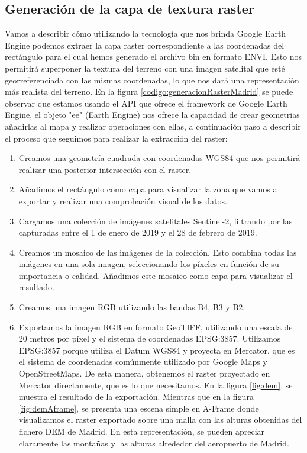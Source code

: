 \documentclass[a4paper, 11pt]{book}
\begin{document}
\subsection{Generación de la capa de textura raster}
\label{sec:raster}
Vamos a describir cómo utilizando la tecnología que nos brinda Google Earth Engine podemos extraer la capa raster correspondiente a las coordenadas del rectángulo para el cual hemos generado el archivo bin en formato ENVI. Esto nos permitirá superponer la textura del terreno con una imagen satelital que esté georreferenciada con las mismas coordenadas, lo que nos dará una representación más realista del terreno.
En la figura \ref{codigo:generacionRasterMadrid} se puede observar que estamos usando el API que ofrece el framework de Google Earth Engine, el objeto "ee" (Earth Engine) nos ofrece la capacidad de crear geometrias añadirlas al mapa y realizar operaciones con ellas, a continuación paso a describir el proceso que seguimos para realizar la extracción del raster:
\begin{enumerate}
    \item Creamos una geometría cuadrada con coordenadas WGS84 que nos permitirá realizar una posterior intersección con el raster.
    \item Añadimos el rectángulo como capa para visualizar la zona que vamos a exportar y realizar una comprobación visual de los datos.
    \item Cargamos una colección de imágenes satelitales Sentinel-2, filtrando por las capturadas entre el 1 de enero de 2019 y el 28 de febrero de 2019.
    \item Creamos un mosaico de las imágenes de la colección. Esto combina todas las imágenes en una sola imagen, seleccionando los píxeles en función de su importancia o calidad. Añadimos este mosaico como capa para visualizar el resultado.
    \item Creamos una imagen RGB utilizando las bandas B4, B3 y B2.
    \item Exportamos la imagen RGB en formato GeoTIFF, utilizando una escala de 20 metros por píxel y el sistema de coordenadas EPSG:3857. Utilizamos EPSG:3857 porque utiliza el Datum WGS84 y proyecta en Mercator, que es el sistema de coordenadas comúnmente utilizado por Google Maps y OpenStreetMaps. De esta manera, obtenemos el raster proyectado en Mercator directamente, que es lo que necesitamos.
    En la figura \ref{fig:dem}, se muestra el resultado de la exportación. Mientras que en la figura \ref{fig:demAframe}, se presenta una escena simple en A-Frame donde visualizamos el raster exportado sobre una malla con las alturas obtenidas del fichero DEM de Madrid. En esta representación, se pueden apreciar claramente las montañas y las alturas alrededor del aeropuerto de Madrid.
\end{enumerate}
\end{document}
